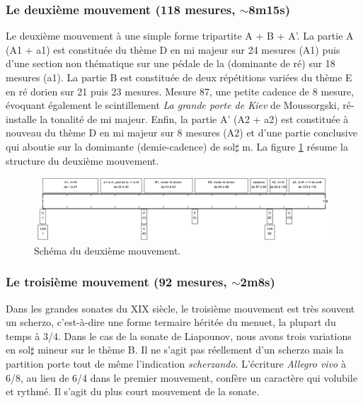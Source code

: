 \subsubsection*{Le deuxième mouvement (118 mesures, $\sim$8m15s)}

Le deuxième mouvement à une simple forme tripartite A + B + A'. La partie A (A1 + a1) est constituée du thème D en mi majeur sur 24 mesures (A1) puis d'une section non thématique sur une pédale de la (dominante de ré) sur 18 mesures (a1). La partie B est constituée de deux répétitions variées du thème E en ré dorien sur 21 puis 23 mesures. Mesure 87, une petite cadence de 8 mesure, évoquant également le scintillement \emph{La grande porte de Kiev} de Moussorgski, ré-installe la tonalité de mi majeur. Enfin, la partie A' (A2 + a2) est constituée à nouveau du thème D en mi majeur sur 8 mesures (A2) et d'une partie conclusive qui aboutie sur la domimante (demie-cadence) de sol$\sharp$ m. La figure \ref{schema-2} résume la structure du deuxième mouvement.

\begin{figure}[!ht]
  \begin{bigcenter}
    \includegraphics[width=16cm, keepaspectratio]{frise-mvt2.png}
  \end{bigcenter}
  \caption{\label{schema-2}Schéma du deuxième mouvement.}
\end{figure}

\subsubsection*{Le troisième mouvement (92 mesures, $\sim$2m8s)}

Dans les grandes sonates du XIX\ieme{} siècle, le troisième mouvement est très souvent un scherzo, c'est-à-dire une forme termaire héritée du menuet, la plupart du temps à 3/4. Dans le cas de la sonate de Liapounov, nous avons trois variations en sol$\sharp$ mineur sur le thème B. Il ne s'agit pas réellement d'un scherzo mais la partition porte tout de même l'indication \emph{scherzando}. L'écriture \emph{Allegro vivo} à 6/8, au lieu de 6/4 dans le premier mouvement, confère un caractère qui volubile et rythmé. Il s'agit du plus court mouvement de la sonate.

